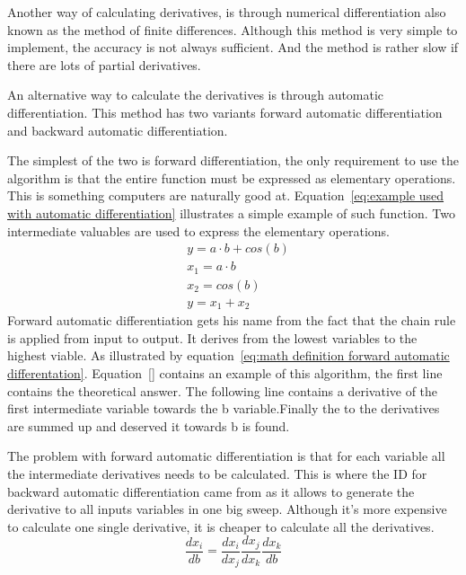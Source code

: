 Another way of calculating derivatives, is through numerical differentiation also known as the method of finite differences. Although this method is very simple to implement, the accuracy is not always sufficient. And the method is rather slow if there are lots of partial derivatives.

An alternative way to calculate the derivatives is through automatic differentiation. This method has two variants forward automatic differentiation and backward automatic differentiation.

The simplest of the two is forward differentiation, the only requirement to use the algorithm is that the entire function must be expressed as elementary operations. This is something computers are naturally good at. Equation~\ref{eq:example used with automatic differentiation} illustrates a simple example of such function. Two intermediate valuables are used to express the elementary operations.
\begin{equation}
	\begin{aligned}
		& y = a \cdot b + cos(b) \\
		& x_1 = a \cdot b \\
		& x_2 = cos(b) \\
		& y = x_1 + x_2		
	\end{aligned}
	\label{eq:example used with automatic differentiation}
\end{equation}
Forward automatic differentiation gets his name from the fact that the chain rule is applied from input to output. It derives from the lowest variables to the highest viable. As illustrated by equation~\ref{eq:math definition forward automatic differentation}. Equation~\ref{} contains an example of this algorithm, the first line contains the theoretical answer. The following line contains a derivative of the first intermediate variable towards the b variable.Finally the to the derivatives are summed up and deserved it towards b is found.

The problem with forward automatic differentiation is that for each variable all the intermediate derivatives needs to be calculated. This is where the ID for backward automatic differentiation came from as it allows to generate the derivative to all inputs variables in one big sweep. Although it's more expensive to calculate one single derivative, it is cheaper to calculate all the derivatives.
\begin{equation}
	\frac{dx_i}{db} = \frac{dx_i}{dx_j}\frac{dx_j}{dx_k}\frac{dx_k}{db}
	\label{eq:math definition forward automatic differentation}
\end{equation}


